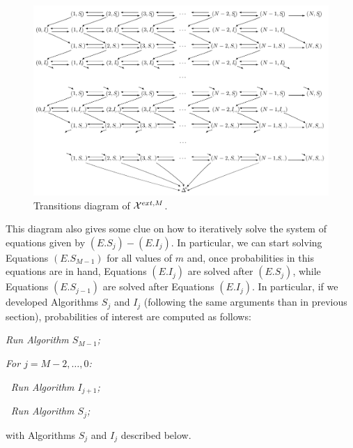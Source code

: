 \documentclass[10pt,A4paper]{article}
\begin{document}
\begin{figure}[h!]
\centering
 \includegraphics[width=\textwidth]{Figure3_new.jpg}
\caption{Transitions diagram of ${\cal X}^{ext,M}$.}
\label{fig:3new}
\end{figure}

\par This diagram also gives some clue on how to iteratively solve the system of equations given by $(E.S_j)-(E.I_j)$. In particular, we can start
solving Equations $(E.S_{M-1})$ for all values of $m$ and, once probabilities in this equations are in hand, Equations $(E.I_j)$ are solved after $(E.S_j)$, while Equations
$(E.S_{j-1})$ are solved after Equations $(E.I_j)$. In particular, if we developed Algorithms $S_j$ and $I_j$ (following the same arguments than in
previous section), probabilities of interest are computed as follows:

\begin{description}
  \item \it Run Algorithm $S_{M-1}$;
  \item \it For $j=M-2,\dots,0$:
  \item $~$\hspace{0.5cm} \it Run Algorithm $I_{j+1}$;
  \item $~$\hspace{0.5cm} \it Run Algorithm $S_{j}$;
\end{description}

\par\noindent with Algorithms $S_j$ and $I_j$ described below.

\newpage

\par {}\\
\end{document}
